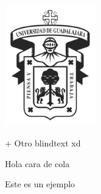 \documentclass[oneside]{article}
\title{\tiText}
\begin{document}

\begin{center}
\includegraphics[width=150px]{imgs/logo_udg.png}
\end{center}

\newpage

\blindtext
\blindtext
\blindtext
\newpage

\blindtext
\blindtext
\blindtext
\blindtext
\blindtext
\blindtext
\blindtext

\blindtext
\blindtext

\blindtext

\blindtext
+
Otro blindtext xd

\blindtext

Hola cara de cola

\blindtext

Este es un ejemplo

\blindtext
\end{document}
